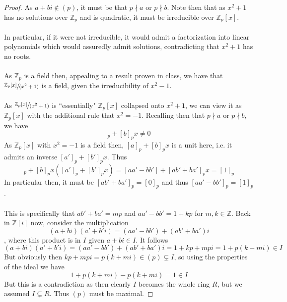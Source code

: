\documentclass[12pt]{article}
\newenvironment{ex}[2][Exercise]{\begin{trivlist}
\item[\hskip \labelsep {\bfseries #1}\hskip \labelsep {\bfseries #2.}]}{\end{trivlist}}
\begin{document}
\begin{ex}{3}
\begin{enumerate}[label=(\alph*)]
\begin{proof}
            As $a + bi \notin (p)$, it must be that $p \nmid a$ or $p \nmid b$. Note then that as $x^2 + 1$ has no solutions over $\mathbb{Z}_p$ and is quadratic, it must be irreducible over $\mathbb{Z}_p[x]$. \\ \\
            In particular, if it were not irreducible, it would admit a factorization into linear polynomials which would assuredly admit solutions, contradicting that $x^2 + 1$ has no roots. \\ \\
            As $\mathbb{Z}_p$ is a field then, appealing to a result proven in class, we have that $\sfrac{\mathbb{Z}_p[x]}{(x^2 + 1)}$ is a field, given the irreducibility of $x^2 - 1$. \\ \\
            As $\sfrac{\mathbb{Z}_p[x]}{(x^2 + 1)}$ is ``essentially" $\mathbb{Z}_p[x]$ collapsed onto $x^2 + 1$, we can view it as $\mathbb{Z}_p[x]$ with the additional rule that $x^2 = -1$. Recalling then that $p \nmid a$ or $p \nmid b$, we have
            \begin{equation}
                [a]_p + [b]_px \neq 0
            \end{equation}
            As $\mathbb{Z}_p[x]$ with $x^2 = -1$ is a field then, $[a]_p + [b]_px$ is a unit here, i.e. it admits an inverse $[a']_p + [b']_px$. Thus
            \begin{equation}
                [a]_p + [b]_px([a']_p + [b']_px) = [aa' - bb'] + [ab' + ba']_px = [1]_p
            \end{equation}
            In particular then, it must be $[ab' + ba']_p = [0]_p$ and thus $[aa' - bb']_p = [1]_p$. \\ \\
            This is specifically that $ab' + ba' = mp$ and $aa' - bb' = 1 + kp$ for $m, k \in \mathbb{Z}$. Back in $\mathbb{Z}[i]$ now, consider the multiplication
            \begin{equation}
                (a + bi)(a' + b'i) = (aa' - bb') + (ab' + ba')i
            \end{equation}
            , where this product is in $I$ given $a + bi \in I$. It follows
            \begin{equation}
                (a + bi)(a' + b'i) = (aa' - bb') + (ab' + ba')i = 1 + kp + mpi = 1 + p(k + mi) \in I
            \end{equation}
            But obviously then $kp + mpi = p(k + mi) \in (p) \subsetneq I$, so using the properties of the ideal we have
            \begin{equation}
                1 + p(k + mi) - p(k + mi) = 1 \in I
            \end{equation}
            But this is a contradiction as then clearly $I$ becomes the whole ring $R$, but we assumed $I \subsetneq R$. Thus $(p)$ must be maximal.
        \end{proof}
    \end{enumerate}
\end{ex}
\end{document}
